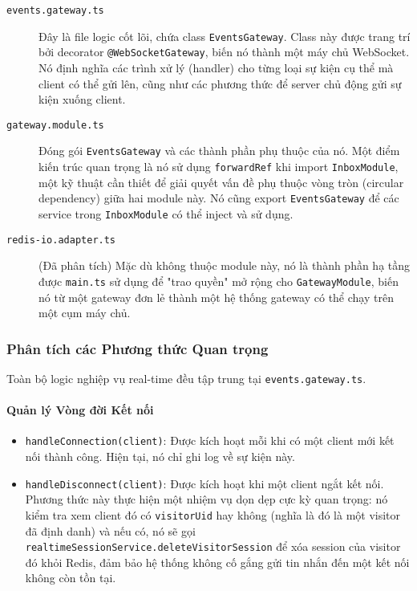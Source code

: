 \begin{description}
    \item[\texttt{events.gateway.ts}] Đây là file logic cốt lõi, chứa class \texttt{EventsGateway}. Class này được trang trí bởi decorator \texttt{@WebSocketGateway}, biến nó thành một máy chủ WebSocket. Nó định nghĩa các trình xử lý (handler) cho từng loại sự kiện cụ thể mà client có thể gửi lên, cũng như các phương thức để server chủ động gửi sự kiện xuống client.
    
    \item[\texttt{gateway.module.ts}] Đóng gói \texttt{EventsGateway} và các thành phần phụ thuộc của nó. Một điểm kiến trúc quan trọng là nó sử dụng \texttt{forwardRef} khi import \texttt{InboxModule}, một kỹ thuật cần thiết để giải quyết vấn đề phụ thuộc vòng tròn (circular dependency) giữa hai module này. Nó cũng export \texttt{EventsGateway} để các service trong \texttt{InboxModule} có thể inject và sử dụng.
    
    \item[\texttt{redis-io.adapter.ts}] (Đã phân tích) Mặc dù không thuộc module này, nó là thành phần hạ tầng được \texttt{main.ts} sử dụng để "trao quyền" mở rộng cho \texttt{GatewayModule}, biến nó từ một gateway đơn lẻ thành một hệ thống gateway có thể chạy trên một cụm máy chủ.
\end{description}

\subsubsection{Phân tích các Phương thức Quan trọng}

Toàn bộ logic nghiệp vụ real-time đều tập trung tại \texttt{events.gateway.ts}.

\paragraph{Quản lý Vòng đời Kết nối}
\begin{itemize}
    \item \texttt{handleConnection(client)}: Được kích hoạt mỗi khi có một client mới kết nối thành công. Hiện tại, nó chỉ ghi log về sự kiện này.
    
    \item \texttt{handleDisconnect(client)}: Được kích hoạt khi một client ngắt kết nối. Phương thức này thực hiện một nhiệm vụ dọn dẹp cực kỳ quan trọng: nó kiểm tra xem client đó có \texttt{visitorUid} hay không (nghĩa là đó là một visitor đã định danh) và nếu có, nó sẽ gọi \texttt{realtimeSessionService.deleteVisitorSession} để xóa session của visitor đó khỏi Redis, đảm bảo hệ thống không cố gắng gửi tin nhắn đến một kết nối không còn tồn tại.
\end{itemize}

